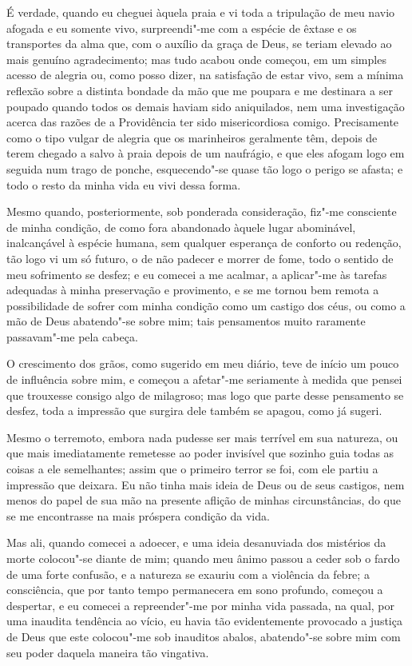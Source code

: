 É verdade, quando eu cheguei àquela praia e vi toda a tripulação de meu
navio afogada e eu somente vivo, surpreendi"-me com a espécie de êxtase e
os transportes da alma que, com o auxílio da graça de Deus, se teriam
elevado ao mais genuíno agradecimento; mas tudo acabou onde começou, em
um simples acesso de alegria ou, como posso dizer, na satisfação de
estar vivo, sem a mínima reflexão sobre a distinta bondade da mão que me
poupara e me destinara a ser poupado quando todos os demais haviam sido
aniquilados, nem uma investigação acerca das razões de a Providência ter
sido misericordiosa comigo. Precisamente como o tipo vulgar de alegria
que os marinheiros geralmente têm, depois de terem chegado a salvo à
praia depois de um naufrágio, e que eles afogam logo em seguida num
trago de ponche, esquecendo"-se quase tão logo o perigo se afasta; e todo
o resto da minha vida eu vivi dessa forma.

Mesmo quando, posteriormente, sob ponderada consideração, fiz"-me
consciente de minha condição, de como fora abandonado àquele lugar
abominável, inalcançável à espécie humana, sem qualquer esperança de
conforto ou redenção, tão logo vi um só futuro, o de não padecer e
morrer de fome, todo o sentido de meu sofrimento se desfez; e eu comecei
a me acalmar, a aplicar"-me às tarefas adequadas à minha preservação e
provimento, e se me tornou bem remota a possibilidade de sofrer com
minha condição como um castigo dos céus, ou como a mão de Deus
abatendo"-se sobre mim; tais pensamentos muito raramente passavam"-me pela
cabeça.

O crescimento dos grãos, como sugerido em meu diário, teve de início um
pouco de influência sobre mim, e começou a afetar"-me seriamente à medida
que pensei que trouxesse consigo algo de milagroso; mas logo que parte
desse pensamento se desfez, toda a impressão que surgira dele também se
apagou, como já sugeri.

Mesmo o terremoto, embora nada pudesse ser mais terrível em sua
natureza, ou que mais imediatamente remetesse ao poder invisível que
sozinho guia todas as coisas a ele semelhantes; assim que o primeiro
terror se foi, com ele partiu a impressão que deixara. Eu não tinha mais
ideia de Deus ou de seus castigos, nem menos do papel de sua mão na
presente aflição de minhas circunstâncias, do que se me encontrasse na
mais próspera condição da vida.

Mas ali, quando comecei a adoecer, e uma ideia desanuviada dos mistérios
da morte colocou"-se diante de mim; quando meu ânimo passou a ceder sob o
fardo de uma forte confusão, e a natureza se exauriu com a violência da
febre; a consciência, que por tanto tempo permanecera em sono profundo,
começou a despertar, e eu comecei a repreender"-me por minha vida
passada, na qual, por uma inaudita tendência ao vício, eu havia tão
evidentemente provocado a justiça de Deus que este colocou"-me sob
inauditos abalos, abatendo"-se sobre mim com seu poder daquela maneira
tão vingativa.

